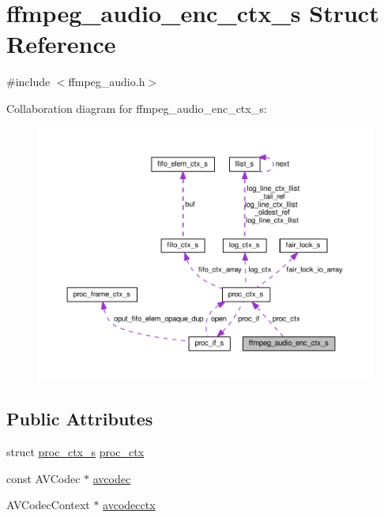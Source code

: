 \hypertarget{structffmpeg__audio__enc__ctx__s}{}\section{ffmpeg\+\_\+audio\+\_\+enc\+\_\+ctx\+\_\+s Struct Reference}
\label{structffmpeg__audio__enc__ctx__s}


{\ttfamily \#include $<$ffmpeg\+\_\+audio.\+h$>$}



Collaboration diagram for ffmpeg\+\_\+audio\+\_\+enc\+\_\+ctx\+\_\+s\+:\nopagebreak
\begin{figure}[H]
\begin{center}
\leavevmode
\includegraphics[width=350pt]{structffmpeg__audio__enc__ctx__s__coll__graph}
\end{center}
\end{figure}
\subsection*{Public Attributes}
\begin{DoxyCompactItemize}
\item 
struct \hyperlink{structproc__ctx__s}{proc\+\_\+ctx\+\_\+s} \hyperlink{structffmpeg__audio__enc__ctx__s_a356a724a749742706bb293f1443e3cc5}{proc\+\_\+ctx}
\item 
const A\+V\+Codec $\ast$ \hyperlink{structffmpeg__audio__enc__ctx__s_ad61caf9672db18679002c9b8dc5c5f3f}{avcodec}
\item 
A\+V\+Codec\+Context $\ast$ \hyperlink{structffmpeg__audio__enc__ctx__s_a6e28c577d3b609bebfcccb091aa25555}{avcodecctx}
\end{DoxyCompactItemize}


